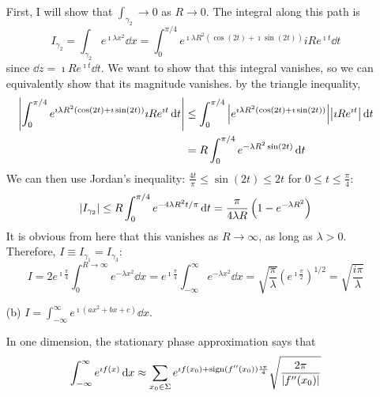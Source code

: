 \documentclass[a4paper,twoside]{article}
\begin{document}
\begin{itemize}
\begin{problem}
            First, I will show that $ \int_{\gamma_2} \to 0 $ as $ R \to 0 $. The integral along this path is
            \begin{equation}
                I_{\gamma_2} = \int_{\gamma_2} e^{\imath \lambda x^2} \dd{x} = \int_0^{\pi / 4} e^{\imath \lambda R^2 (\cos(2t) + \imath \sin(2t))} i R e^{\imath t} \dd{t}
            \end{equation}
            since $ \dd{z} = \imath R e^{\imath t} \dd{t} $. We want to show that this integral vanishes, so we can equivalently show that its magnitude vanishes. by the triangle inequality,
            \begin{align}
                \abs{\int_0^{\pi / 4} e^{\imath \lambda R^2 (\cos(2t) + \imath \sin(2t))} \imath R e^{\imath t} \dd{t}} &\leq \int_0^{\pi / 4} \abs{e^{\imath \lambda R^2 (\cos(2t) + \imath \sin(2t))}} \abs{\imath R e^{\imath t}} \dd{t}\\
                &= R \int_0^{\pi / 4} e^{- \lambda R^2 \sin(2t)} \dd{t}
            \end{align}
            We can then use Jordan's inequality: $ \frac{4t}{\pi} \leq \sin(2t) \leq 2t $ for $ 0 \leq t \leq \frac{\pi}{4} $:
            \begin{equation}
                \abs{I_{\gamma_2}} \leq R \int_0^{\pi / 4} e^{-4 \lambda R^2 t / \pi} \dd{t} = \frac{\pi}{4 \lambda R} \left( 1 - e^{- \lambda R^2} \right)
            \end{equation}
            It is obvious from here that this vanishes as $ R \to \infty $, as long as $ \lambda > 0 $. Therefore, $ I \equiv I_{\gamma_1} = I_{\gamma_3} $:
            \begin{equation}
                I = 2 e^{\imath \frac{\pi}{4}} \int_0^{R \to \infty} e^{- \lambda x^2} \dd{x} = e^{\imath \frac{\pi}{4}} \int_{- \infty}^{\infty} e^{- \lambda x^2} \dd{x} = \sqrt{\frac{\pi}{\lambda}} \left(e^{\imath \frac{\pi}{2}}\right)^{1/2} = \sqrt{\frac{i \pi}{\lambda}}
            \end{equation}
        \end{problem}
    \item[(b)] $ I = \int_{- \infty}^{\infty} e^{\imath (ax^2 + b x + c)} \dd{x} $.
        \begin{problem}
            In one dimension, the stationary phase approximation says that
            \begin{equation}
                \int_{- \infty}^{\infty} e^{\imath f(x)} \dd{x} \approx \sum_{x_0 \in \Sigma} e^{\imath f(x_0) + \text{sign}(f''(x_0)) \frac{\imath \pi}{4}} \sqrt{\frac{2 \pi}{\abs{f''(x_0)}}}

\end{equation}
\end{problem}
\end{itemize}
\end{document}
